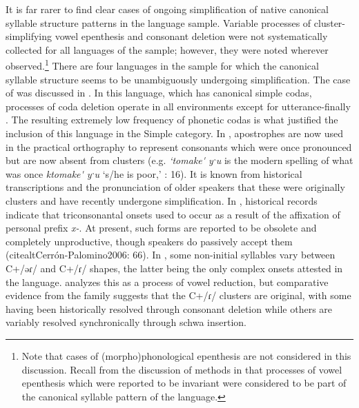   It is far rarer to find clear cases of ongoing simplification of native canonical syllable structure patterns in the language sample. Variable processes of cluster-simplifying vowel epenthesis and consonant deletion were not systematically collected for all languages of the sample; however, they were noted wherever observed.\footnote{{Note that cases of (morpho)phonological epenthesis are not considered in this discussion. Recall from the discussion of methods in  that processes of vowel epenthesis which were reported to be invariant were considered to be part of the canonical syllable pattern of the language.}} There are four languages in the sample for which the canonical syllable structure seems to be unambiguously undergoing simplification. The case of  was discussed in . In this language, which has canonical simple codas, processes of coda deletion operate in all environments except for utterance-finally \citep[22-24]{Yumitani1998}. The resulting extremely low frequency of phonetic codas is what justified the inclusion of this language in the Simple category. In , apostrophes are now used in the practical orthography to represent consonants which were once pronounced but are now absent from clusters (e.g. \textit{‘tomake\'{} yˑu} is the modern spelling of what was once \textit{ktomake\'{} yˑu} ‘s/he is poor,’ \citealt{Leavitt1996}: 16). It is known from historical transcriptions and the pronunciation of older speakers that these were originally clusters and have recently undergone simplification. In , historical records indicate that triconsonantal onsets used to occur as a result of the affixation of personal prefix \textit{x-}. At present, such forms are reported to be obsolete and completely unproductive, though speakers do passively accept them (citealt{Cerrón-Palomino2006}: 66). In , some non-initial syllables vary between C+/əɾ/ and C+/ɾ/ shapes, the latter being the only complex onsets attested in the language. \citet[30--32]{VanBreugel2008} analyzes this as a process of vowel reduction, but comparative evidence from the family suggests that the C+/ɾ/ clusters are original, with some having been historically resolved through consonant deletion while others are variably resolved synchronically through schwa insertion.

